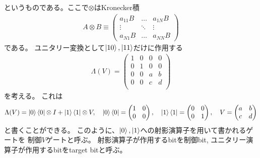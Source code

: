\documentclass[]{ltjsarticle}
\begin{document}
というものである。ここで$\otimes$はKronecker積
\begin{align}
    A \otimes B 
    \equiv
    \begin{pmatrix}
        a_{11}B & \dots & a_{1N}B \\
        \vdots & \ddots & \vdots \\
        a_{N1}B & \dots & a_{NN}B
    \end{pmatrix}
\end{align}
である。
ユニタリー変換として$\ket{10}, \ket{11}$だけに作用する
\begin{align}
    \Lambda(V)
    =
    \begin{pmatrix}
        1 & 0 & 0 & 0 \\ 
        0 & 1 & 0 & 0 \\ 
        0 & 0 & a & b \\ 
        0 & 0 & c & d \\ 
    \end{pmatrix}
\end{align}
を考える。
これは
\begin{align}
    \Lambda(V) = \ket{0}\bra{0} \otimes I + \ket{1}\bra{1} \otimes V, \quad 
    \ket{0}\bra{0}
    =
    \begin{pmatrix}
        1 & 0 \\
        0 & 0  
    \end{pmatrix},\quad
    \ket{1}\bra{1}
    =
    \begin{pmatrix}
        0 & 0 \\
        0 & 1  
    \end{pmatrix},\quad
    V = 
    \begin{pmatrix}
        a & b \\
        c & d  
    \end{pmatrix}
\end{align}
と書くことができる。
このように、$\ket{0}, \ket{1}$への射影演算子を用いて書かれるゲートを
制御$V$ゲートと呼ぶ。
射影演算子が作用するbitを制御bit,
ユニタリー演算子が作用するbitをtarget bitと呼ぶ。
\end{document}
